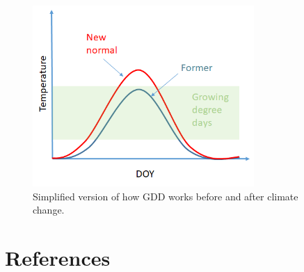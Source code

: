 \documentclass[11pt]{article}
\begin{document}
\begin{figure}[h!]
\includegraphics[width=0.75\textwidth]{..//figures/simpletempcurve_fromlucidboard.png}
\caption{Simplified version of how GDD works before and after climate change.}
\label{fig:simpletemp}
\end{figure}
\fi

\clearpage
\section{References}


\end{document}
